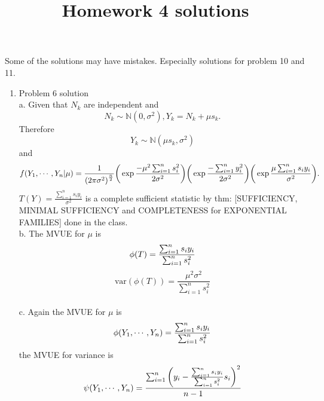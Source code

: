 \documentclass[a4paper,english,10pt]{article}
\title{Homework 4 solutions}
\begin{document}
\maketitle

Some of the solutions may have mistakes. Especially solutions for problem 10 and 11.

\begin{enumerate}
\item {Problem 6 solution}\\
a. Given that $N_k$ are independent and
 \begin{equation*}
        N_k \sim \mathbb{N}(0,\sigma^2), Y_k=N_k+\mu s_k.
 \end{equation*}
Therefore 
\begin{equation*}
  Y_k \sim \mathbb{N}(\mu s_k, \sigma^2)
\end{equation*}
and 
\begin{equation*}
 f(Y_1,\cdots, Y_n|\mu)=\frac{1}{{(2\pi\sigma^2)}^{\frac{n}{2}}} \bigg{(} \exp{\frac{-\mu^2\sum_{i=1}^{n} s_{i}^2}{2\sigma^2}}\bigg{)}
\bigg{(}\exp{\frac{-\sum_{i=1}^{n} y_{i}^2}{2\sigma^2}}\bigg{)}\bigg{(}\exp{\frac{\mu\sum_{i=1}^{n} s_{i}y_{i}}{\sigma^2}}\bigg{)}.
\end{equation*}
$T(Y)=\frac{\sum_{i=1}^{n} s_{i}y_{i}}{\sigma^2}$ is a complete sufficient statistic by
thm: [SUFFICIENCY, MINIMAL SUFFICIENCY and COMPLETENESS for EXPONENTIAL FAMILIES] done in the class.
\\

b. The MVUE for $\mu$ is
\begin{equation*}
 \phi(T)=\frac{\sum_{i=1}^{n} s_{i}y_{i}}{\sum_{i=1}^{n} s_{i}^2} \\ 
 \end{equation*}
\begin{equation*}
 \text{var}(\phi(T))=\frac{\mu^2\sigma^2}{\sum_{i=1}^{n}s_{i}^2}
\end{equation*}
\\

c. Again the MVUE for $\mu$ is
\begin{equation*}
 \phi(Y_1,\cdots,Y_n)=\frac{\sum_{i=1}^{n} s_{i}y_{i}}{\sum_{i=1}^{n} s_{i}^2} \\ 
 \end{equation*}
 the MVUE for variance is
 \begin{equation*}
 \psi(Y_1,\cdots,Y_n)=\frac{\sum_{i=1}^{n}{\bigg{(}y_i-\frac{\sum_{i=1}^{n}s_{i}y_{i}}{\sum_{i=1}^{n}s_{i}^2} s_i\bigg{)}^2}}{n-1} \\ 
 \end{equation*}


\end{enumerate}
\end{document}
